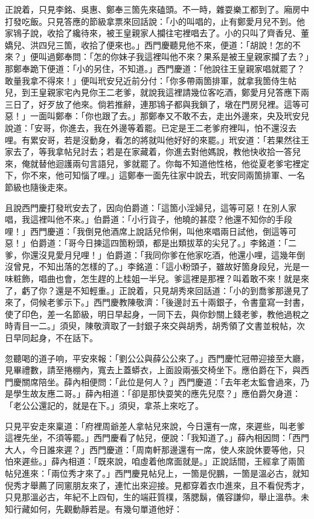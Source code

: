 正說着，只見李銘、吳惠、鄭奉三箇先來磕頭。不一時，雜耍樂工都到了。廂房中打發吃飯。只見答應的節級拿票來回話說：「小的叫唱的，止有鄭愛月兒不到。他家鴇子說，收拾了纔待來，被王皇親家人攔往宅裡唱去了。小的只叫了齊香兒、董嬌兒、洪四兒三箇，收拾了便來也。」西門慶聽見他不來，便道：「胡說！怎的不來？」便叫過鄭奉問：「怎的你妹子我這裡叫他不來？果系是被王皇親家攔了去？」那鄭奉跪下便道：「小的另住，不知道。」西門慶道：「他說往王皇親家唱就罷了？敢量我拿不得來！」便叫玳安兒近前分付：「你多帶兩箇排軍，就拿我箇侍生帖兒，到王皇親家宅內見你王二老爹，就說我這裡請幾位客吃酒，鄭愛月兒答應下兩三日了，好歹放了他來。倘若推辭，連那鴇子都與我鎖了，墩在門房兒裡。這等可惡！」一面叫鄭奉：「你也跟了去。」那鄭奉又不敢不去，走出外邊來，央及玳安兒說道：「安哥，你進去，我在外邊等着罷。已定是王二老爹府裡叫，怕不還沒去哩。有累安哥，若是沒動身，看怎的將就叫他好好的來罷。」玳安道：「若果然往王家去了，等我拿帖兒討去；若是在家藏着，你進去對他媽說，教他快收拾一答兒來，俺就替他迴護兩句言語兒，爹就罷了。你每不知道他性格，他從夏老爹宅裡定下，你不來，他可知惱了哩。」這鄭奉一面先往家中說去，玳安同兩箇排軍、一名節級也隨後走來。

且說西門慶打發玳安去了，因向伯爵道：「這箇小淫婦兒，這等可惡！在別人家唱，我這裡叫他不來。」伯爵道：「小行貨子，他曉的甚麼？他還不知你的手段哩！」西門慶道：「我倒見他酒席上說話兒伶俐，叫他來唱兩日試他，倒這等可惡！」伯爵道：「哥今日揀這四箇粉頭，都是出類拔萃的尖兒了。」李銘道：「二爹，你還沒見愛月兒哩！」伯爵道：「我同你爹在他家吃酒，他還小哩，這幾年倒沒曾見，不知出落的怎樣的了。」李銘道：「這小粉頭子，雖故好箇身段兒，光是一味粧飾，唱曲也會，怎生趕的上桂姐一半兒。爹這裡是那裡？叫着敢不來！就是來了，虧了你？還是不知輕重。」正說着，只見胡秀來回話道：「小的到喬爹那邊見了來了，伺候老爹示下。」西門慶教陳敬濟：「後邊討五十兩銀子，令書童寫一封書，使了印色，差一名節級，明日早起身，一同下去，與你鈔關上錢老爹，教他過稅之時青目一二。」須臾，陳敬濟取了一封銀子來交與胡秀，胡秀領了文書並稅帖，次日早同起身，不在話下。

忽聽喝的道子响，平安來報：「劉公公與薛公公來了。」西門慶忙冠帶迎接至大廳，見畢禮數，請至捲棚內，寬去上蓋蟒衣，上面設兩張交椅坐下。應伯爵在下，與西門慶關席陪坐。薛內相便問：「此位是何人？」西門慶道：「去年老太監會過來，乃是學生故友應二哥。」薛內相道：「卻是那快耍笑的應先兒麼？」應伯爵欠身道：「老公公還記的，就是在下。」須臾，拿茶上來吃了。

只見平安走來稟道：「府裡周爺差人拿帖兒來說，今日還有一席，來遲些，叫老爹這裡先坐，不須等罷。」西門慶看了帖兒，便說：「我知道了。」薛內相因問：「西門大人，今日誰來遲？」西門慶道：「周南軒那邊還有一席，使人來說休要等他，只怕來遲些。」薛內相道：「既來說，咱虛着他席面就是。」正說話間，王經拿了兩箇帖兒進來：「兩位秀才來了。」西門慶見帖兒上，一箇是倪鵬，一箇是溫必古，就知倪秀才舉薦了同窻朋友來了，連忙出來迎接。見都穿着衣巾進來，且不看倪秀才，只見那溫必古，年紀不上四旬，生的端莊質樸，落腮鬍，儀容謙仰，舉止溫恭。未知行藏如何，先觀動靜若是。有幾句單道他好：


